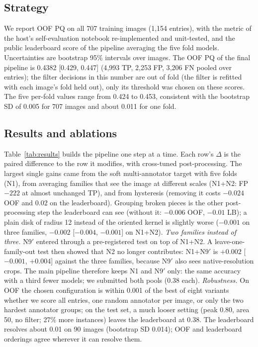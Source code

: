 \documentclass[sigconf]{acmart}
\newcommand{\pqoof}{0.4382}        %
\newcommand{\pqci}{[0.429, 0.447]} %
\begin{document}
\subsection{Strategy}
We report OOF PQ on all 707 training images (1{,}154 entries), with the metric of the host's self-evaluation notebook re-implemented and unit-tested, and the public leaderboard score of the pipeline averaging the five fold models. Uncertainties are bootstrap 95\% intervals over images. The OOF PQ of the final pipeline is \pqoof{} \pqci{} (4{,}993 TP, 2{,}253 FP, 3{,}206 FN pooled over entries); the filter decisions in this number are out of fold (the filter is refitted with each image's fold held out), only its threshold was chosen on these scores. The five per-fold values range from 0.424 to 0.453, consistent with the bootstrap SD of 0.005 for 707 images and about 0.011 for one fold.

\subsection{Results and ablations}
Table~\ref{tab:results} builds the pipeline one step at a time. Each row's $\Delta$ is the paired difference to the row it modifies, with cross-tuned post-processing. The largest single gains came from the soft multi-annotator target with five folds (N1), from averaging families that see the image at different scales (N1+N2: FP $-222$ at almost unchanged TP), and from hysteresis (removing it costs $-0.024$ OOF and 0.02 on the leaderboard). Grouping broken pieces is the other post-processing step the leaderboard can see (without it: $-0.006$ OOF, $-0.01$ LB); a plain disk of radius 12 instead of the oriented kernel is slightly worse ($-0.001$ on three families, $-0.002$ [$-0.004$, $-0.001$] on N1+N2). \emph{Two families instead of three.} N9$'$ entered through a pre-registered test on top of N1+N2. A leave-one-family-out test then showed that N2 no longer contributes: N1+N9$'$ is $+0.002$ [$-0.001$, $+0.004$] against the three families, because N9$'$ also sees native-resolution crops. The main pipeline therefore keeps N1 and N9$'$ only: the same accuracy with a third fewer models; we submitted both pools (0.38 each). \emph{Robustness.} On OOF the chosen configuration is within 0.001 of the best of eight variants whether we score all entries, one random annotator per image, or only the two hardest annotator groups; on the test set, a much looser setting (peak 0.80, area 50, no filter; 27\% more instances) leaves the leaderboard at 0.38. The leaderboard resolves about 0.01 on 90 images (bootstrap SD 0.014); OOF and leaderboard orderings agree wherever it can resolve them.
\end{document}
